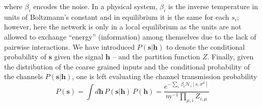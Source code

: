\documentclass{article}
\begin{document}
where $\beta_i$ encodes the noise.  In a physical system, $\beta_i$ is the inverse temperature in units of Boltzmann's constant and in equilibrium it is the same for each $s_i$; however, here the network is only in a local equilibrium as the units are not allowed to exchange ``energy'' (information) among themselves due to the lack of pairwise interactions. We have introduced $P(\mathbf{s} | \mathbf{h})$ to denote the conditional probability of $\mathbf{s}$ given the signal $\mathbf{h}$ --  and the partition function $Z$. Finally, given the distribution of the coarse grained inputs and the conditional probability of the channels $P(\mathbf{s}|\mathbf{h})$, one is left evaluating the channel transmission probability
%
\begin{equation} \label{eq:ps3}
P(\mathbf{s}) = \int d \mathbf{h} \, P(\mathbf{s} | \mathbf{h}) \, P(\mathbf{h}) =  \frac{e^{-\sum_i \, \beta_i \mathscr{H}_i[s, x^{\mu}]}}{m^{-1}\prod_{\mu,i} Z_{i, \mu}}   %
\end{equation}
\end{document}
